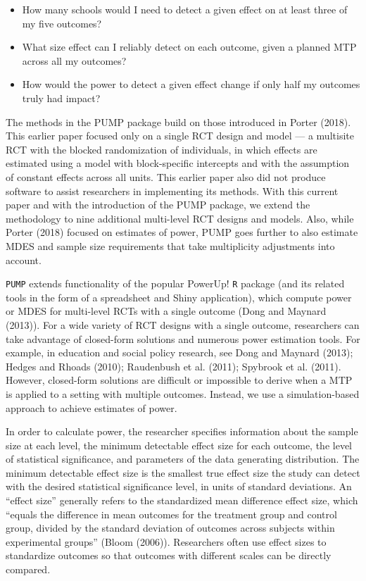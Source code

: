 \documentclass[
]{article}
\providecommand{\tightlist}{%
  \setlength{\itemsep}{0pt}\setlength{\parskip}{0pt}}
\begin{document}
\begin{itemize}
\tightlist
\item
  How many schools would I need to detect a given effect on at least
  three of my five outcomes?
\item
  What size effect can I reliably detect on each outcome, given a
  planned MTP across all my outcomes?
\item
  How would the power to detect a given effect change if only half my
  outcomes truly had impact?
\end{itemize}

The methods in the PUMP package build on those introduced in Porter
(2018). This earlier paper focused only on a single RCT design and model
--- a multisite RCT with the blocked randomization of individuals, in
which effects are estimated using a model with block-specific intercepts
and with the assumption of constant effects across all units. This
earlier paper also did not produce software to assist researchers in
implementing its methods. With this current paper and with the
introduction of the PUMP package, we extend the methodology to nine
additional multi-level RCT designs and models. Also, while Porter (2018)
focused on estimates of power, PUMP goes further to also estimate MDES
and sample size requirements that take multiplicity adjustments into
account.

\texttt{PUMP} extends functionality of the popular PowerUp! \texttt{R}
package (and its related tools in the form of a spreadsheet and Shiny
application), which compute power or MDES for multi-level RCTs with a
single outcome (Dong and Maynard (2013)). For a wide variety of RCT
designs with a single outcome, researchers can take advantage of
closed-form solutions and numerous power estimation tools. For example,
in education and social policy research, see Dong and Maynard (2013);
Hedges and Rhoads (2010); Raudenbush et al. (2011); Spybrook et al.
(2011). However, closed-form solutions are difficult or impossible to
derive when a MTP is applied to a setting with multiple outcomes.
Instead, we use a simulation-based approach to achieve estimates of
power.

In order to calculate power, the researcher specifies information about
the sample size at each level, the minimum detectable effect size for
each outcome, the level of statistical significance, and parameters of
the data generating distribution. The minimum detectable effect size is
the smallest true effect size the study can detect with the desired
statistical significance level, in units of standard deviations. An
``effect size'' generally refers to the standardized mean difference
effect size, which ``equals the difference in mean outcomes for the
treatment group and control group, divided by the standard deviation of
outcomes across subjects within experimental groups'' (Bloom (2006)).
Researchers often use effect sizes to standardize outcomes so that
outcomes with different scales can be directly compared.
\end{document}
